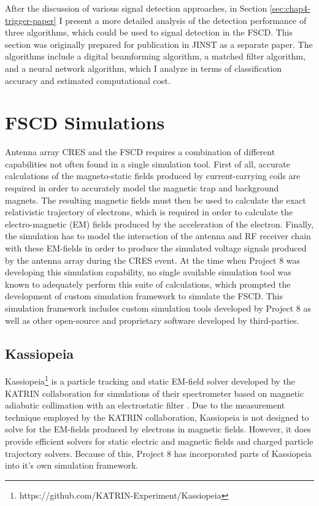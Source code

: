 After the discussion of various signal detection approaches, in Section \ref{sec:chap4-trigger-paper} I present a more detailed analysis of the detection performance of three algorithms, which could be used to signal detection in the FSCD. This section was originally prepared for publication in JINST as a separate paper. The algorithms include a digital beamforming algorithm, a matched filter algorithm, and a neural network algorithm, which I analyze in terms of classification accuracy and estimated computational cost.  

\section{FSCD Simulations}
\label{sec:chap4-simulations}

Antenna array CRES and the FSCD requires a combination of different capabilities not often found in a single simulation tool. First of all, accurate calculations of the magneto-static fields produced by current-carrying coils are required in order to accurately model the magnetic trap and background magnets. The resulting magnetic fields must then be used to calculate the exact relativistic trajectory of electrons, which is required in order to calculate the electro-magnetic (EM) fields produced by the acceleration of the electron. Finally, the simulation has to model the interaction of the antenna and RF receiver chain with these EM-fields in order to produce the simulated voltage signals produced by the antenna array during the CRES event. At the time when Project 8 was developing this simulation capability, no single available simulation tool was known to adequately perform this suite of calculations, which prompted the development of custom simulation framework to simulate the FSCD. This simulation framework includes custom simulation tools developed by Project 8 as well as other open-source and proprietary software developed by third-parties.

\subsection{Kassiopeia}

Kassiopeia\footnote{https://github.com/KATRIN-Experiment/Kassiopeia} is a particle tracking and static EM-field solver developed by the KATRIN collaboration for simulations of their spectrometer based on magnetic adiabatic collimation with an electrostatic filter \cite{kassiopeia}. Due to the measurement technique employed by the KATRIN collaboration, Kassiopeia is not designed to solve for the EM-fields produced by electrons in magnetic fields. However, it does provide efficient solvers for static electric and magnetic fields and charged particle trajectory solvers. Because of this, Project 8 has incorporated parts of Kassiopeia into it's own simulation framework. 

